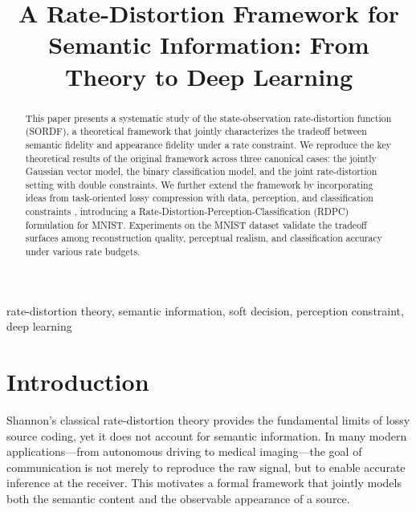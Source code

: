 \documentclass[conference]{IEEEtran}
\begin{document}
\title{A Rate-Distortion Framework for Semantic Information: From Theory to Deep Learning}

\author{
}

\maketitle

\begin{abstract}
This paper presents a systematic study of the state-observation rate-distortion function (SORDF), a theoretical framework that jointly characterizes the tradeoff between semantic fidelity and appearance fidelity under a rate constraint. We reproduce the key theoretical results of the original framework across three canonical cases: the jointly Gaussian vector model, the binary classification model, and the joint rate-distortion setting with double constraints. We further extend the framework by incorporating ideas from task-oriented lossy compression with data, perception, and classification constraints \cite{wang2024task}, introducing a Rate-Distortion-Perception-Classification (RDPC) formulation for MNIST. Experiments on the MNIST dataset validate the tradeoff surfaces among reconstruction quality, perceptual realism, and classification accuracy under various rate budgets.
\end{abstract}

\begin{IEEEkeywords}
rate-distortion theory, semantic information, soft decision, perception constraint, deep learning
\end{IEEEkeywords}

\section{Introduction}

Shannon's classical rate-distortion theory provides the fundamental limits of lossy source coding, yet it does not account for semantic information. In many modern applications---from autonomous driving to medical imaging---the goal of communication is not merely to reproduce the raw signal, but to enable accurate inference at the receiver. This motivates a formal framework that jointly models both the semantic content and the observable appearance of a source.
\end{document}
